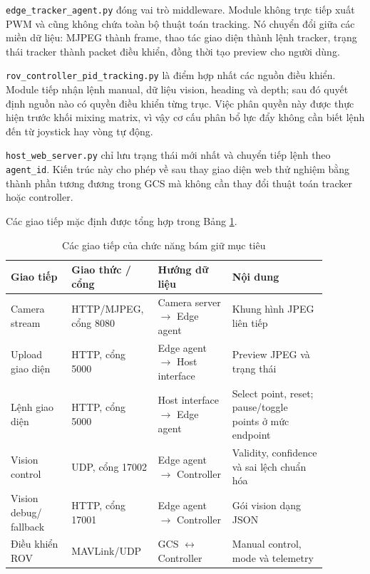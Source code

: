 \documentclass[../DoAn.tex]{subfiles}
\begin{document}
\texttt{edge\_tracker\_agent.py} đóng vai trò middleware. Module không trực tiếp xuất PWM và cũng không chứa toàn bộ thuật toán tracking. Nó chuyển đổi giữa các miền dữ liệu: MJPEG thành frame, thao tác giao diện thành lệnh tracker, trạng thái tracker thành packet điều khiển, đồng thời tạo preview cho người dùng.

\texttt{rov\_controller\_pid\_tracking.py} là điểm hợp nhất các nguồn điều khiển. Module tiếp nhận lệnh manual, dữ liệu vision, heading và depth; sau đó quyết định nguồn nào có quyền điều khiển từng trục. Việc phân quyền này được thực hiện trước khối mixing matrix, vì vậy cơ cấu phân bổ lực đẩy không cần biết lệnh đến từ joystick hay vòng tự động.

\texttt{host\_web\_server.py} chỉ lưu trạng thái mới nhất và chuyển tiếp lệnh theo \texttt{agent\_id}. Kiến trúc này cho phép về sau thay giao diện web thử nghiệm bằng thành phần tương đương trong GCS mà không cần thay đổi thuật toán tracker hoặc controller.

Các giao tiếp mặc định được tổng hợp trong Bảng \ref{tab:giaotiep_chucnang}.

\begin{table}[htbp]
    \centering
    \caption{Các giao tiếp của chức năng bám giữ mục tiêu}
    \label{tab:giaotiep_chucnang}
    \renewcommand{\arraystretch}{1.3}
    \begin{tabular}{|p{0.18\linewidth}|p{0.20\linewidth}|p{0.22\linewidth}|p{0.28\linewidth}|}
        \hline
        \textbf{Giao tiếp} & \textbf{Giao thức / cổng} & \textbf{Hướng dữ liệu} & \textbf{Nội dung} \\
        \hline
        Camera stream & HTTP/MJPEG, cổng 8080 & Camera server $\to$ Edge agent & Khung hình JPEG liên tiếp \\
        \hline
        Upload giao diện & HTTP, cổng 5000 & Edge agent $\to$ Host interface & Preview JPEG và trạng thái \\
        \hline
        Lệnh giao diện & HTTP, cổng 5000 & Host interface $\to$ Edge agent & Select point, reset; pause/toggle points ở mức endpoint \\
        \hline
        Vision control & UDP, cổng 17002 & Edge agent $\to$ Controller & Validity, confidence và sai lệch chuẩn hóa \\
        \hline
        Vision debug/ fallback & HTTP, cổng 17001 & Edge agent $\to$ Controller & Gói vision dạng JSON \\
        \hline
        Điều khiển ROV & MAVLink/UDP & GCS $\leftrightarrow$ Controller & Manual control, mode và telemetry \\
        \hline
    \end{tabular}
\end{table}
\end{document}
